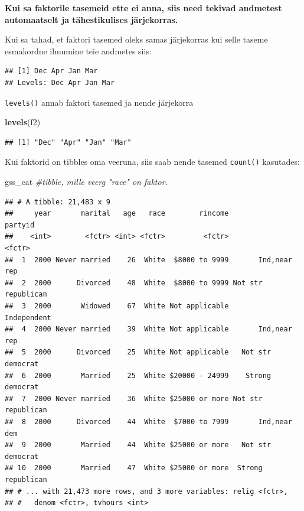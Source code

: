 \documentclass[]{book}
\newenvironment{Shaded}{\begin{snugshade}}{\end{snugshade}}
\newcommand{\KeywordTok}[1]{\textcolor[rgb]{0.13,0.29,0.53}{\textbf{#1}}}
\newcommand{\StringTok}[1]{\textcolor[rgb]{0.31,0.60,0.02}{#1}}
\newcommand{\CommentTok}[1]{\textcolor[rgb]{0.56,0.35,0.01}{\textit{#1}}}
\newcommand{\OperatorTok}[1]{\textcolor[rgb]{0.81,0.36,0.00}{\textbf{#1}}}
\newcommand{\NormalTok}[1]{#1}
\begin{document}
\textbf{Kui sa faktorile tasemeid ette ei anna, siis need tekivad
andmetest automaatselt ja tähestikulises järjekorras.}

Kui sa tahad, et faktori tasemed oleks samas järjekorras kui selle
taseme esmakordne ilmumine teie andmetes siis:

\begin{Shaded}
\end{Shaded}

\begin{verbatim}
## [1] Dec Apr Jan Mar
## Levels: Dec Apr Jan Mar
\end{verbatim}

\texttt{levels()} annab faktori tasemed ja nende järjekorra

\begin{Shaded}
\begin{Highlighting}[]
\KeywordTok{levels}\NormalTok{(f2)}
\end{Highlighting}
\end{Shaded}

\begin{verbatim}
## [1] "Dec" "Apr" "Jan" "Mar"
\end{verbatim}

Kui faktorid on tibbles oma veeruna, siis saab nende tasemed
\texttt{count()} kasutades:

\begin{Shaded}
\begin{Highlighting}[]
\NormalTok{gss_cat }\CommentTok{#tibble, mille veerg "race" on faktor.}
\end{Highlighting}
\end{Shaded}

\begin{verbatim}
## # A tibble: 21,483 x 9
##     year       marital   age   race        rincome            partyid
##    <int>        <fctr> <int> <fctr>         <fctr>             <fctr>
##  1  2000 Never married    26  White  $8000 to 9999       Ind,near rep
##  2  2000      Divorced    48  White  $8000 to 9999 Not str republican
##  3  2000       Widowed    67  White Not applicable        Independent
##  4  2000 Never married    39  White Not applicable       Ind,near rep
##  5  2000      Divorced    25  White Not applicable   Not str democrat
##  6  2000       Married    25  White $20000 - 24999    Strong democrat
##  7  2000 Never married    36  White $25000 or more Not str republican
##  8  2000      Divorced    44  White  $7000 to 7999       Ind,near dem
##  9  2000       Married    44  White $25000 or more   Not str democrat
## 10  2000       Married    47  White $25000 or more  Strong republican
## # ... with 21,473 more rows, and 3 more variables: relig <fctr>,
## #   denom <fctr>, tvhours <int>
\end{verbatim}
\end{document}
